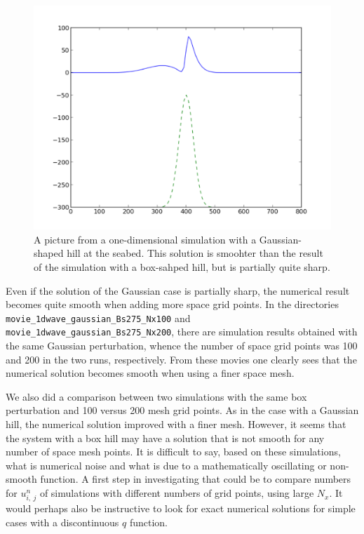 \documentclass[twoside]{article}
\begin{document}
\begin{figure} 
  \centering
  \includegraphics[scale=0.4]{gustavs_codes/movie_1dwave_gaussian_Bs250/figure.pdf}
  \caption{A picture from a one-dimensional simulation with a Gaussian-shaped hill at the seabed. This solution is smoohter than the result of the simulation with a box-sahped hill, but is partially quite sharp.} %
\end{figure}

Even if the solution of the Gaussian case is partially sharp, the numerical result becomes quite smooth when adding more space grid points. In the directories \verb+movie_1dwave_gaussian_Bs275_Nx100+ and \newline \verb+movie_1dwave_gaussian_Bs275_Nx200+, there are simulation results obtained with the same Gaussian perturbation, whence the number of space grid points was 100 and 200 in the two runs, respectively. From these movies one clearly sees that the numerical solution becomes smooth when using a finer space mesh.

We also did a comparison between two simulations with the same box perturbation and 100 versus 200 mesh grid points. As in the case with a Gaussian hill, the numerical solution improved with a finer mesh. However, it seems that the system with a box hill may have a solution that is not smooth for any number of space mesh points. It is difficult to say, based on these simulations, what is numerical noise and what is due to a mathematically oscillating or non-smooth function. A first step in investigating that could be to compare numbers for $u_{i,\ j}^{n}$ of simulations with different numbers of grid points, using large $N_{x}$. It would perhaps also be instructive to look for exact numerical solutions for simple cases with a discontinuous $q$ function. 
 
\end{document}
